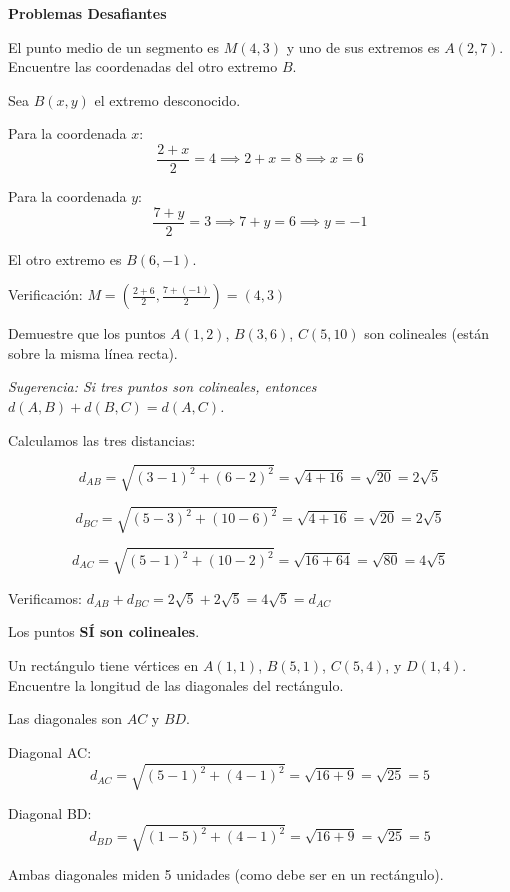 \begin{exercise}
\textbf{Problemas Desafiantes}

\problem El punto medio de un segmento es $M(4, 3)$ y uno de sus extremos es $A(2, 7)$. Encuentre las coordenadas del otro extremo $B$.

\begin{solucion}
Sea $B(x, y)$ el extremo desconocido.

Para la coordenada $x$:
$$\frac{2 + x}{2} = 4 \implies 2 + x = 8 \implies x = 6$$

Para la coordenada $y$:
$$\frac{7 + y}{2} = 3 \implies 7 + y = 6 \implies y = -1$$

El otro extremo es $B(6, -1)$.

Verificación: $M = \left(\frac{2+6}{2}, \frac{7+(-1)}{2}\right) = (4, 3)$ \checkmark
\end{solucion}

\problem Demuestre que los puntos $A(1, 2)$, $B(3, 6)$, $C(5, 10)$ son colineales (están sobre la misma línea recta).

\textit{Sugerencia: Si tres puntos son colineales, entonces $d(A,B) + d(B,C) = d(A,C)$.}

\begin{solucion}
Calculamos las tres distancias:

$$d_{AB} = \sqrt{(3-1)^2 + (6-2)^2} = \sqrt{4+16} = \sqrt{20} = 2\sqrt{5}$$

$$d_{BC} = \sqrt{(5-3)^2 + (10-6)^2} = \sqrt{4+16} = \sqrt{20} = 2\sqrt{5}$$

$$d_{AC} = \sqrt{(5-1)^2 + (10-2)^2} = \sqrt{16+64} = \sqrt{80} = 4\sqrt{5}$$

Verificamos: $d_{AB} + d_{BC} = 2\sqrt{5} + 2\sqrt{5} = 4\sqrt{5} = d_{AC}$ \checkmark

Los puntos \textbf{SÍ son colineales}.
\end{solucion}

\problem Un rectángulo tiene vértices en $A(1, 1)$, $B(5, 1)$, $C(5, 4)$, y $D(1, 4)$. Encuentre la longitud de las diagonales del rectángulo.

\begin{solucion}
Las diagonales son $AC$ y $BD$.

Diagonal AC:
$$d_{AC} = \sqrt{(5-1)^2 + (4-1)^2} = \sqrt{16+9} = \sqrt{25} = 5$$

Diagonal BD:
$$d_{BD} = \sqrt{(1-5)^2 + (4-1)^2} = \sqrt{16+9} = \sqrt{25} = 5$$

Ambas diagonales miden 5 unidades (como debe ser en un rectángulo).
\end{solucion}
\end{exercise}

